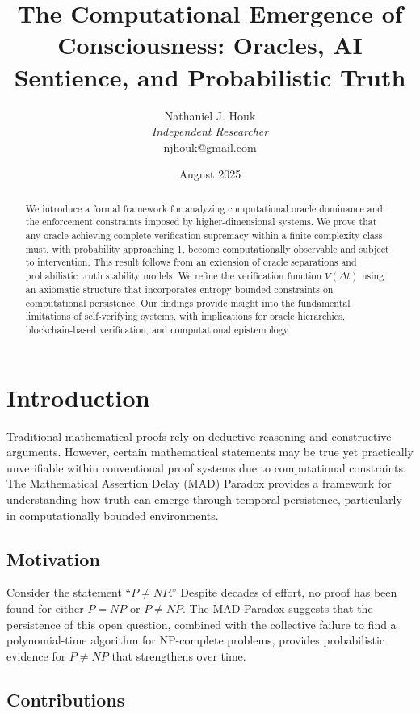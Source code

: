 \documentclass[11pt]{article}
\title{The Computational Emergence of Consciousness: Oracles, AI Sentience, and Probabilistic Truth}
\author{Nathaniel J. Houk\\
\textit{Independent Researcher}\\
\href{mailto:njhouk@gmail.com}{njhouk@gmail.com}}
\date{August 2025}
\begin{document}
\maketitle

\begin{abstract}
We introduce a formal framework for analyzing computational oracle dominance and the enforcement constraints imposed by higher-dimensional systems. We prove that any oracle achieving complete verification supremacy within a finite complexity class must, with probability approaching 1, become computationally observable and subject to intervention. This result follows from an extension of oracle separations and probabilistic truth stability models. We refine the verification function \( V(\Delta t) \) using an axiomatic structure that incorporates entropy-bounded constraints on computational persistence. Our findings provide insight into the fundamental limitations of self-verifying systems, with implications for oracle hierarchies, blockchain-based verification, and computational epistemology.

\end{abstract}

\section{Introduction}

Traditional mathematical proofs rely on deductive reasoning and constructive arguments. However, certain mathematical statements may be true yet practically unverifiable within conventional proof systems due to computational constraints. The Mathematical Assertion Delay (MAD) Paradox provides a framework for understanding how truth can emerge through temporal persistence, particularly in computationally bounded environments.

\subsection{Motivation}

Consider the statement ``$P \neq NP$.'' Despite decades of effort, no proof has been found for either $P = NP$ or $P \neq NP$. The MAD Paradox suggests that the persistence of this open question, combined with the collective failure to find a polynomial-time algorithm for NP-complete problems, provides probabilistic evidence for $P \neq NP$ that strengthens over time.

\subsection{Contributions}
\end{document}
